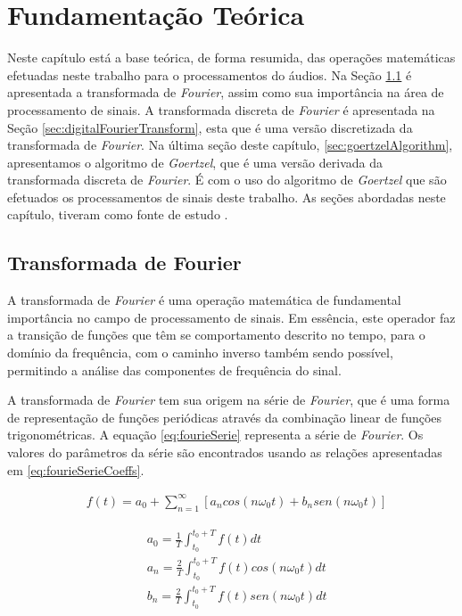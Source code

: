 \documentclass[monografia]{subfiles}
\begin{document}
	\chapter{Fundamentação Teórica}	
		Neste capítulo está a base teórica, de forma resumida, das operações matemáticas efetuadas neste trabalho para o processamentos do áudios. 
		Na Seção \ref{sec:fourierTransform} é apresentada a transformada de \textit{Fourier}, assim como sua importância na área de processamento
		de sinais. A transformada discreta de \textit{Fourier} é apresentada na Seção \ref{sec:digitalFourierTransform}, esta 
		que é uma versão discretizada da transformada de \textit{Fourier}. Na última seção deste capítulo, \ref{sec:goertzelAlgorithm}, apresentamos o 
		algoritmo de \textit{Goertzel}, que é uma versão derivada da transformada discreta de \textit{Fourier}. É com o uso do algoritmo
		de \textit{Goertzel} que são efetuados
		os processamentos de sinais deste trabalho. As seções abordadas neste capítulo, tiveram como fonte de estudo \cite{oppenheim}.

	\section{Transformada de Fourier}
	\label{sec:fourierTransform}
		A transformada de \textit{Fourier} é uma operação matemática de fundamental importância no campo de processamento de sinais.
		Em essência, este operador faz a transição de funções que têm se comportamento descrito no tempo, para o domínio da
		frequência, com o caminho inverso também sendo possível, permitindo a análise das componentes de frequência do sinal.

		A transformada de \textit{Fourier} tem sua origem na série de \textit{Fourier}, que é uma forma de representação de funções periódicas 
		através da combinação linear de funções trigonométricas. A equação \ref{eq:fourieSerie} representa a série de \textit{Fourier}.
		Os valores do parâmetros da série são encontrados usando as relações apresentadas em \ref{eq:fourieSerieCoeffs}.

			\begin{align}
			\label{eq:fourieSerie}
				&f(t)  = a_{0} + \sum_{n=1}^{\infty }[a_{n} cos(n \omega_{0} t) + b_{n} sen(n \omega_{0} t)] 
			\end{align}


			\begin{align}
			\label{eq:fourieSerieCoeffs}
				&a_{0} = \frac{1}{T} \int_{t_{0}}^{t_{0}+T}f(t)dt \\
				&a_{n} = \frac{2}{T} \int_{t_{0}}^{t_{0}+T}f(t) cos(n \omega_{0} t)dt \\
				&b_{n} = \frac{2}{T} \int_{t_{0}}^{t_{0}+T}f(t) sen(n \omega_{0} t)dt				
			\end{align}
\end{document}
